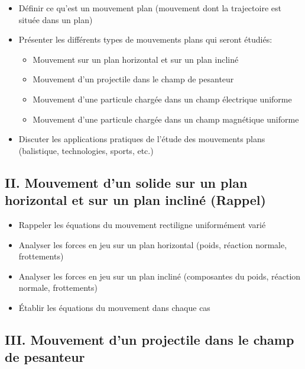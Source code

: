 \documentclass[12pt]{article}
\begin{document}
\begin{itemize}
    \item Définir ce qu'est un mouvement plan (mouvement dont la trajectoire est située dans un plan)
    \item Présenter les différents types de mouvements plans qui seront étudiés:
    \begin{itemize}
        \item Mouvement sur un plan horizontal et sur un plan incliné
        \item Mouvement d'un projectile dans le champ de pesanteur
        \item Mouvement d'une particule chargée dans un champ électrique uniforme
        \item Mouvement d'une particule chargée dans un champ magnétique uniforme
    \end{itemize}
    \item Discuter les applications pratiques de l'étude des mouvements plans (balistique, technologies, sports, etc.)
\end{itemize}

\subsection*{II. Mouvement d'un solide sur un plan horizontal et sur un plan incliné (Rappel)}

\begin{itemize}
    \item Rappeler les équations du mouvement rectiligne uniformément varié
    \item Analyser les forces en jeu sur un plan horizontal (poids, réaction normale, frottements)
    \item Analyser les forces en jeu sur un plan incliné (composantes du poids, réaction normale, frottements)
    \item Établir les équations du mouvement dans chaque cas
\end{itemize}

\subsection*{III. Mouvement d'un projectile dans le champ de pesanteur}
\end{document}
